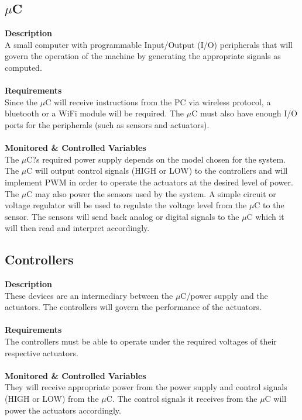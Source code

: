 \documentclass[titlepage]{article}
\begin{document}
\subsection{$\mu$C}
\textbf{Description}\\
A small computer with programmable Input/Output (I/O) peripherals that will govern the operation of the machine by generating the appropriate signals as computed.\\~\\
\textbf{Requirements}\\
Since the $\mu$C will receive instructions from the PC via wireless protocol, a bluetooth or a WiFi module will be required. The $\mu$C must also have enough I/O ports for the peripherals (such as sensors and actuators).\\~\\
\textbf{Monitored \& Controlled Variables}\\
The $\mu$C?s required power supply depends on the model chosen for the system. The $\mu$C will output control signals (HIGH or LOW) to the controllers and will implement PWM in order to operate the actuators at the desired level of power. The $\mu$C may also power the sensors used by the system. A simple circuit or voltage regulator will be used to regulate the voltage level from the $\mu$C to the sensor. The sensors will send back analog or digital signals to the $\mu$C which it will then read and interpret accordingly.

\subsection{Controllers}
\textbf{Description}\\
These devices are an intermediary between the $\mu$C/power supply and the actuators. The controllers will govern the performance of the actuators.\\~\\
\textbf{Requirements}\\
The controllers must be able to operate under the required voltages of their respective actuators.\\~\\
\textbf{Monitored \& Controlled Variables}\\
They will receive appropriate power from the power supply and control signals (HIGH or LOW) from the $\mu$C. The control signals it receives from the $\mu$C will power the actuators accordingly.

\newpage
\end{document}
